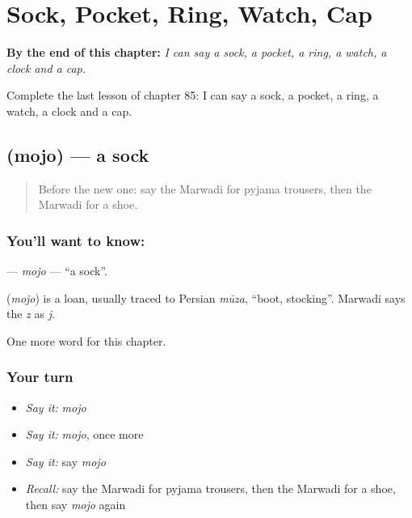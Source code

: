
\chapter{Sock, Pocket, Ring, Watch, Cap}
\label{ch:mw-sock-pocket-ring-watch-cap}

\begin{chapteropening}
\textbf{By the end of this chapter:} \emph{I can say a sock, a pocket, a ring, a watch, a clock and a cap.}

Complete the last lesson of chapter 85: I can say a sock, a pocket, a ring, a watch, a clock and a cap.
\end{chapteropening}

\section[\texorpdfstring{\mw{मोजो} (mojo)}{मोजो (mojo)}]{ (mojo) — a sock}

\label{lesson:MW-C85-mojo}



\begin{quote}
Before the new one: say the Marwadi for pyjama trousers, then the Marwadi for a shoe.
\end{quote}

\subsection*{You'll want to know: }
\textbf{} — \emph{mojo} — \textquotedblleft{}a sock\textquotedblright{}.

\begin{cousinweb}
\textbf{} (\emph{mojo}) is a loan, usually traced to Persian \emph{mūza}, \textquotedblleft{}boot, stocking\textquotedblright{}. Marwadi says the \emph{z} as \emph{j}.
\end{cousinweb}

\begin{grammarlens}[title={What you've built}]
One more word for this chapter.
\end{grammarlens}

\subsection*{Your turn}
\begin{itemize}
\raggedright
  \item \emph{Say it:} \emph{mojo}
  \item \emph{Say it:} \emph{mojo}, once more
  \item \emph{Say it:} say \emph{mojo}
  \item \emph{Recall:} say the Marwadi for pyjama trousers, then the Marwadi for a shoe, then say \emph{mojo} again
\end{itemize}

